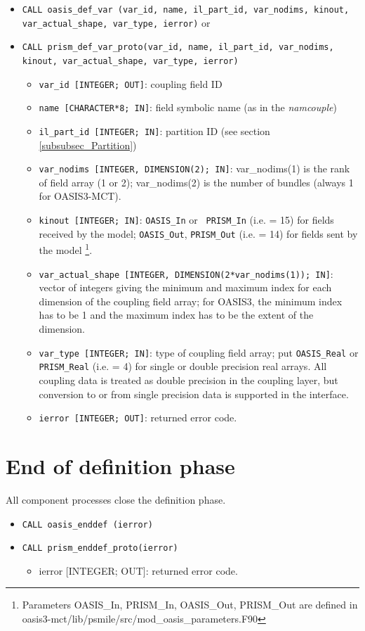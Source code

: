 \begin{itemize}

\item {\tt CALL oasis\_def\_var       (var\_id, name, il\_part\_id,
  var\_nodims, kinout, \newline var\_actual\_shape, var\_type, ierror)} or

\item {\tt CALL prism\_def\_var\_proto(var\_id, name, il\_part\_id,
  var\_nodims, kinout, var\_actual\_shape, var\_type, ierror)}


\begin{itemize}
 \item {\tt var\_id [INTEGER; OUT]}: coupling field ID
 \item {\tt name [CHARACTER*8; IN]}: field symbolic name (as in the
   {\it namcouple})
 \item {\tt il\_part\_id [INTEGER; IN]}: partition ID (see section \ref{subsubsec_Partition})
 \item {\tt var\_nodims [INTEGER, DIMENSION(2); IN]}: var\_nodims(1) is
   the rank of field array (1 or 2); var\_nodims(2) is the number of
   bundles (always 1 for OASIS3-MCT). 
 \item {\tt kinout [INTEGER; IN]}: {\tt OASIS\_In} or {\tt
   PRISM\_In} (i.e. = 15) for fields received by
   the model; {\tt OASIS\_Out}, {\tt PRISM\_Out} (i.e. = 14) for
   fields sent by the model
\footnote{Parameters OASIS\_In,
   PRISM\_In, OASIS\_Out, PRISM\_Out are defined in oasis3-mct/lib/psmile/src/mod\_oasis\_parameters.F90}.
 \item {\tt var\_actual\_shape [INTEGER, DIMENSION(2*var\_nodims(1)); IN]}: 
   vector of integers giving the minimum and maximum index for each
   dimension of the coupling field array; for OASIS3, the minimum
   index has to be 1 and the maximum index has to be the extent of the
   dimension.
 \item {\tt var\_type [INTEGER; IN]}: type of coupling field array;
   put {\tt OASIS\_Real} or {\tt PRISM\_Real} (i.e. = 4) for single or double precision real
   arrays.  All coupling data is treated as double precision in the
   coupling layer, but conversion to or from single precision data
   is supported in the interface.
 \item {\tt ierror [INTEGER; OUT]}: returned error code. 
\end{itemize}
\end{itemize}

\section{End of definition phase}
\label{subsubsec_Endofdefinition}
All component processes close the definition phase.
\begin{itemize}
\item {\tt CALL oasis\_enddef       (ierror)}
\item {\tt CALL prism\_enddef\_proto(ierror)}
\begin{itemize}
  \item ierror [INTEGER; OUT]: returned error code.
\end{itemize}
\end{itemize}

